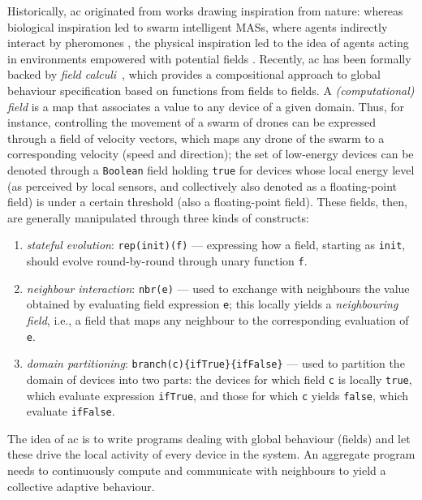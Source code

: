\documentclass[11pt]{article}
\begin{document}
Historically, \ac{ac} originated from works drawing inspiration from nature: whereas biological inspiration led to swarm intelligent MASs, where agents indirectly interact by pheromones \cite{DBLP:conf/atal/ParunakBS02}, the physical inspiration led to the idea of agents acting in environments empowered with potential fields \cite{DBLP:journals/trob/HwangA92}.
%
Recently, \ac{ac} has been formally backed by \emph{field calculi}~\cite{viroli2019jlamp-si-coord}, which provides a compositional approach to global behaviour specification based on functions from fields to fields.
%
A \emph{(computational) field} is a map that associates a value to any device of a given domain.
%
Thus, for instance, controlling the movement of a swarm of drones can be expressed through a field of velocity vectors, which maps any drone of the swarm to a corresponding velocity (speed and direction); 
%
the set of low-energy devices can be denoted through a \lstinline|Boolean| field holding \texttt{true} for devices whose local energy level (as perceived by local sensors, and collectively also denoted as a floating-point field) is under a certain threshold (also a floating-point field).
%
These fields, then, are generally manipulated through three kinds of constructs:
\begin{enumerate}
\item \emph{stateful evolution}: \lstinline|rep(init)(f)| --- expressing how a field, starting as \lstinline|init|, should evolve round-by-round through unary function \lstinline|f|.
\item \emph{neighbour interaction}: \lstinline|nbr(e)| --- used to exchange with neighbours the value obtained by evaluating field expression \lstinline|e|; this locally yields a \emph{neighbouring field}, i.e., a field that maps any neighbour to the corresponding evaluation of \lstinline|e|.
\item \emph{domain partitioning}: \lstinline|branch(c){ifTrue}{ifFalse}| --- used to partition the domain of devices into two parts: the devices for which field \lstinline|c| is locally \lstinline|true|, which evaluate expression \lstinline|ifTrue|, and those for which \lstinline|c| yields \lstinline|false|, which evaluate \lstinline|ifFalse|. 
\end{enumerate}
%
The idea of \ac{ac} is to write programs dealing with global behaviour (fields) and let these drive the local activity of every device in the system.
%
An aggregate program needs to continuously compute and communicate with neighbours to yield a collective adaptive behaviour.
%
\end{document}
